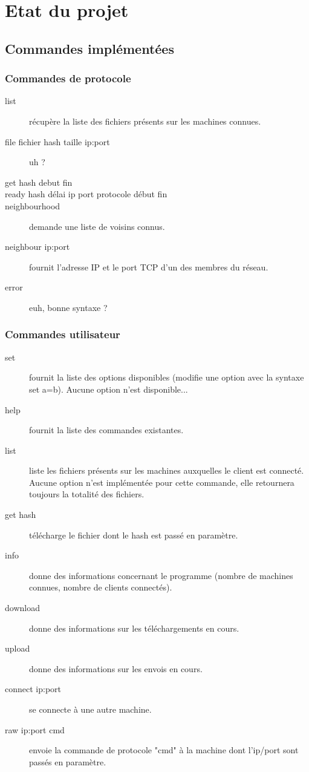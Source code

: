 \section{Etat du projet}

\subsection{Commandes implémentées}

\subsubsection{Commandes de protocole}
\begin{description}
    \item[list] récupère la liste des fichiers présents sur les machines
connues.
    \item[file fichier hash taille ip:port] uh ?
    \item[get hash debut fin] 
    \item[ready hash délai ip port protocole début fin]
    \item[neighbourhood] demande une liste de voisins connus.
    \item[neighbour ip:port] fournit l'adresse IP et le port TCP d'un des
membres du réseau.
    \item[error] euh, bonne syntaxe ?
\end{description}



\subsubsection{Commandes utilisateur}
\begin{description}
    \item[set] fournit la liste des options disponibles (modifie une option avec
la syntaxe set a=b). Aucune option n'est disponible...
    \item[help] fournit la liste des commandes existantes.
    \item[list] liste les fichiers présents sur les machines auxquelles le
client est connecté. Aucune option n'est implémentée pour cette commande, elle
retournera toujours la totalité des fichiers.
    \item[get hash] télécharge le fichier dont le hash est passé en paramètre. 
    \item[info] donne des informations concernant le programme (nombre de
machines connues, nombre de clients connectés).
    \item[download] donne des informations sur les téléchargements en cours.
    \item[upload] donne des informations sur les envois en cours.
    \item[connect ip:port] se connecte à une autre machine.
    \item[raw ip:port cmd] envoie la commande de protocole "cmd" à la machine
dont l'ip/port sont passés en paramètre.
\end{description}



